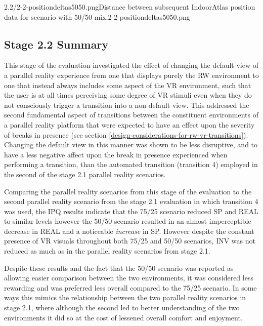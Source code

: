        {2.2/2-2-positiondeltas5050.png}{Distance between subsequent IndoorAtlas position data for scenario with 50/50 mix.}{2-2-positiondeltas5050.png}


\subsection{Stage 2.2 Summary}

This stage of the evaluation investigated the effect of changing the default view of a parallel reality experience from one that displays purely the RW environment to one that instead always includes some aspect of the VR environment, such that the user is at all times perceiving some degree of VR stimuli even when they do not consciously trigger a transition into a non-default view. This addressed the second fundamental aspect of transitions between the constituent environments of a parallel reality platform that were expected to have an effect upon the severity of breaks in presence (see section \ref{design-considerations-for-rw-vr-transitions}). Changing the default view in this manner was shown to be less disruptive, and to have a less negative affect upon the break in presence experienced when performing a transition, than the automated transition (transition 4) employed in the second of the stage 2.1 parallel reality scenarios.

Comparing the parallel reality scenarios from this stage of the evaluation to the second parallel reality scenario from the stage 2.1 evaluation in which transition 4 was used, the IPQ results indicate that the 75/25 scenario reduced SP and REAL to similar levels however the 50/50 scenario resulted in an almost imperceptible decrease in REAL and a noticeable \textit{increase} in SP. However despite the constant presence of VR visuals throughout both 75/25 and 50/50 scenarios, INV was not reduced as much as in the parallel reality scenarios from stage 2.1.

Despite these results and the fact that the 50/50 scenario was reported as allowing easier comparison between the two environments, it was considered less rewarding and was preferred less overall compared to the 75/25 scenario. In some ways this mimics the relationship between the two parallel reality scenarios in stage 2.1, where although the second led to better understanding of the two environments it did so at the cost of lessened overall comfort and enjoyment.

